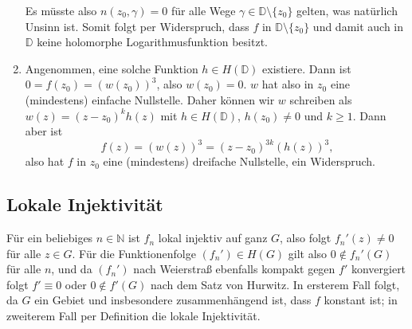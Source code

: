 \documentclass[a4paper]{article}
\begin{document}
\begin{enumerate}
\begin{equation*}
    \end{equation*}
    Es müsste also $n(z_0, \gamma) = 0$ für alle Wege $\gamma \in \mathds{D} \setminus \{z_0\}$ gelten, was natürlich Unsinn ist.
    Somit folgt per Widerspruch, dass $f$ in $\mathds{D} \setminus \{z_0\}$ und damit auch in $\mathds{D}$ keine holomorphe Logarithmusfunktion besitzt.
    \item Angenommen, eine solche Funktion $h \in H(\mathds{D})$ existiere.
    Dann ist $0 = f(z_0) = (w(z_0))^3$, also $w(z_0) = 0$.
    $w$ hat also in $z_0$ eine (mindestens) einfache Nullstelle.
    Daher können wir $w$ schreiben als $w(z) = (z-z_0)^k h(z)$ mit $h \in H(\mathds{D})$, $h(z_0) \neq 0$ und $k \geq 1$.
    Dann aber ist 
    \begin{equation*}
        f(z) = (w(z))^3 = (z-z_0)^{3k} (h(z))^3\text{,}
    \end{equation*}
    also hat $f$ in $z_0$ eine (mindestens) dreifache Nullstelle, ein Widerspruch.
\end{enumerate}


\subsection{Lokale Injektivität}

Für ein beliebiges $n \in \mathds{N}$ ist $f_n$ lokal injektiv auf ganz $G$, also folgt $f_n'(z) \neq 0$ für alle $z \in G$.
Für die Funktionenfolge $(f_n') \in H(G)$ gilt also $0 \notin f_n'(G)$ für alle $n$, und da $(f_n')$ nach Weierstraß ebenfalls kompakt gegen $f'$ konvergiert folgt $f' \equiv 0$ oder $0 \notin f'(G)$ nach dem Satz von Hurwitz.
In ersterem Fall folgt, da $G$ ein Gebiet und insbesondere zusammenhängend ist, dass $f$ konstant ist; in zweiterem Fall per Definition die lokale Injektivität.
\end{document}
